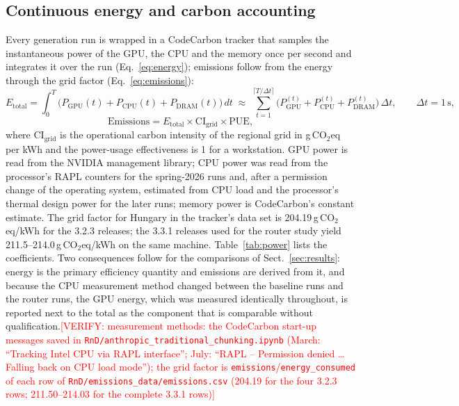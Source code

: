 \documentclass[pdflatex,sn-mathphys-num]{sn-jnl}
\newcommand{\todo}[1]{\textcolor{red}{#1}}
\newcommand{\verify}[1]{\todo{[VERIFY: #1]}}
\newcommand{\gco}{g\,CO$_2$eq}
\theoremstyle{thmstyleone}%
\theoremstyle{thmstylethree}%
\begin{document}
\begin{table}[htbp]
\end{table}

\subsection{Continuous energy and carbon accounting}\label{sec:energy}

Every generation run is wrapped in a CodeCarbon tracker \cite{codecarbon_software,lacoste2019quantifyingcarbonemissionsmachine} that samples the instantaneous power of the GPU, the CPU and the memory once per second and integrates it over the run (Eq.~\eqref{eq:energy}); emissions follow from the energy through the grid factor (Eq.~\eqref{eq:emissions}):
\begin{equation}\label{eq:energy}
E_{\mathrm{total}}=\int_{0}^{T}\bigl(P_{\mathrm{GPU}}(t)+P_{\mathrm{CPU}}(t)+P_{\mathrm{DRAM}}(t)\bigr)\,dt
\;\approx\;\sum_{t=1}^{\lceil T/\Delta t\rceil}\bigl(P^{(t)}_{\mathrm{GPU}}+P^{(t)}_{\mathrm{CPU}}+P^{(t)}_{\mathrm{DRAM}}\bigr)\,\Delta t,\qquad \Delta t=1\,\mathrm{s},
\end{equation}
\begin{equation}\label{eq:emissions}
\mathrm{Emissions}=E_{\mathrm{total}}\times\mathrm{CI}_{\mathrm{grid}}\times\mathrm{PUE},
\end{equation}
where $\mathrm{CI}_{\mathrm{grid}}$ is the operational carbon intensity of the regional grid in \gco{} per kWh and the power-usage effectiveness is 1 for a workstation. GPU power is read from the NVIDIA management library; CPU power was read from the processor's RAPL counters for the spring-2026 runs and, after a permission change of the operating system, estimated from CPU load and the processor's thermal design power for the later runs; memory power is CodeCarbon's constant estimate. The grid factor for Hungary in the tracker's data set is 204.19\,\gco{}/kWh for the 3.2.3 releases; the 3.3.1 releases used for the router study yield 211.5--214.0\,\gco{}/kWh on the same machine. Table~\ref{tab:power} lists the coefficients. Two consequences follow for the comparisons of Sect.~\ref{sec:results}: energy is the primary efficiency quantity and emissions are derived from it, and because the CPU measurement method changed between the baseline runs and the router runs, the GPU energy, which was measured identically throughout, is reported next to the total as the component that is comparable without qualification.\verify{measurement methods: the CodeCarbon start-up messages saved in \texttt{RnD/anthropic\_traditional\_chunking.ipynb} (March: ``Tracking Intel CPU via RAPL interface''; July: ``RAPL -- Permission denied \ldots Falling back on CPU load mode''); the grid factor is \texttt{emissions}/\texttt{energy\_consumed} of each row of \texttt{RnD/emissions\_data/emissions.csv} (204.19 for the four 3.2.3 rows; 211.50--214.03 for the complete 3.3.1 rows)}
\end{document}
